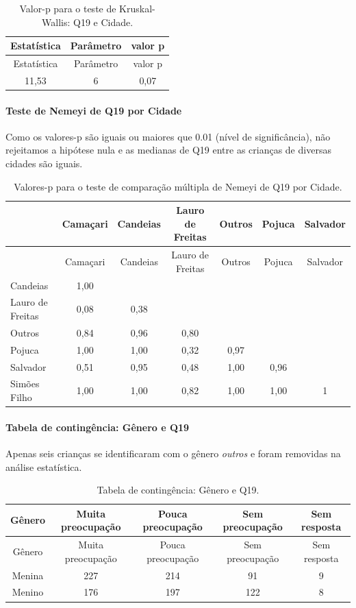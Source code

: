 \documentclass[]{article}
\let\oldparagraph\paragraph
\renewcommand{\paragraph}[1]{\oldparagraph{#1}\mbox{}}
\begin{document}
\begin{longtable}[]{@{}ccc@{}}
\caption{\label{tab:unnamed-chunk-315}Valor-p para o teste de Kruskal-Wallis: Q19 e Cidade.}\tabularnewline
\toprule
Estatística & Parâmetro & valor p\tabularnewline
\midrule
\endfirsthead
\toprule
Estatística & Parâmetro & valor p\tabularnewline
\midrule
\endhead
11,53 & 6 & 0,07\tabularnewline
\bottomrule
\end{longtable}

\hypertarget{teste-de-nemeyi-de-q19-por-cidade}{%
\paragraph{Teste de Nemeyi de Q19 por Cidade}\label{teste-de-nemeyi-de-q19-por-cidade}}

Como os valores-p são iguais ou maiores que 0.01 (nível de significância), não rejeitamos a hipótese nula e as medianas de Q19 entre as crianças de diversas cidades são iguais.

\begin{longtable}[]{@{}lcccccc@{}}
\caption{\label{tab:unnamed-chunk-317}Valores-p para o teste de comparação múltipla de Nemeyi de Q19 por Cidade.}\tabularnewline
\toprule
& Camaçari & Candeias & Lauro de Freitas & Outros & Pojuca & Salvador\tabularnewline
\midrule
\endfirsthead
\toprule
& Camaçari & Candeias & Lauro de Freitas & Outros & Pojuca & Salvador\tabularnewline
\midrule
\endhead
Candeias & 1,00 & & & & &\tabularnewline
Lauro de Freitas & 0,08 & 0,38 & & & &\tabularnewline
Outros & 0,84 & 0,96 & 0,80 & & &\tabularnewline
Pojuca & 1,00 & 1,00 & 0,32 & 0,97 & &\tabularnewline
Salvador & 0,51 & 0,95 & 0,48 & 1,00 & 0,96 &\tabularnewline
Simões Filho & 1,00 & 1,00 & 0,82 & 1,00 & 1,00 & 1\tabularnewline
\bottomrule
\end{longtable}

\cleardoublepage

\hypertarget{tabela-de-continguxeancia-guxeanero-e-q19}{%
\paragraph{Tabela de contingência: Gênero e Q19}\label{tabela-de-continguxeancia-guxeanero-e-q19}}

Apenas seis crianças se identificaram com o gênero \emph{outros} e foram removidas na análise estatística.

\begin{longtable}[]{@{}ccccc@{}}
\caption{\label{tab:unnamed-chunk-318}Tabela de contingência: Gênero e Q19.}\tabularnewline
\toprule
Gênero & Muita preocupação & Pouca preocupação & Sem preocupação & Sem resposta\tabularnewline
\midrule
\endfirsthead
\toprule
Gênero & Muita preocupação & Pouca preocupação & Sem preocupação & Sem resposta\tabularnewline
\midrule
\endhead
Menina & 227 & 214 & 91 & 9\tabularnewline
Menino & 176 & 197 & 122 & 8\tabularnewline
\bottomrule
\end{longtable}
\end{document}
